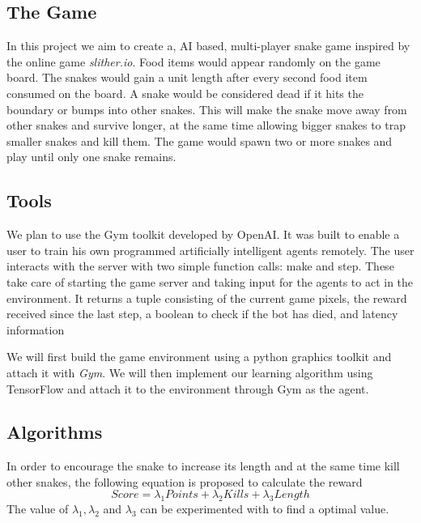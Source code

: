 \documentclass[conference]{IEEEtran}
\begin{document}
\subsection{The Game}

In this project we aim to create a, AI based, multi-player snake game inspired
by the online game \textit{slither.io}. Food items would appear randomly on
the game board. The snakes would gain a unit length after every second food
item consumed on the board. A snake would be considered dead if it hits the
boundary or bumps into other snakes. This will make the snake move away from
other snakes and survive longer, at the same time allowing bigger snakes to
trap smaller snakes and kill them. The game would spawn two or more snakes
and play until only one snake remains.\newline\par

\subsection{Tools}
We plan to use the Gym toolkit developed by OpenAI\cite{sd1}. It was built to
enable a user to train his own programmed artificially intelligent agents
remotely. The user interacts with the server with two simple function calls:
make and step. These take care of starting the game server and taking input
for the agents to act in the environment. It returns a tuple consisting of the
current game pixels, the reward received since the last step, a boolean to
check if the bot has died, and latency information
\newline\par
We will first build the game environment using a python graphics toolkit
and attach it with \textit{Gym}. We will then implement our learning algorithm
using TensorFlow\cite{n2} and attach it to the environment through Gym as
the agent. \newline\par

\subsection{Algorithms}
In order to encourage the snake to increase its length and at the same time kill other snakes, the following equation is proposed to calculate the reward
\begin{equation}
Score=\lambda_1 Points+ \lambda_2 Kills+\lambda_3Length
\end{equation}
The value of \({\lambda_1,\lambda_2}\) and \({\lambda_3}\) can be experimented with to find a optimal value.
\end{document}
